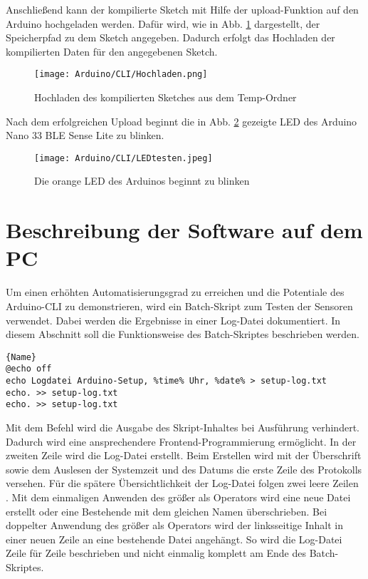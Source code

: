 Anschließend kann der kompilierte Sketch mit Hilfe der \glqq upload\grqq{}-Funktion auf den Arduino hochgeladen werden. Dafür wird, wie in Abb. \ref{Hochladen} dargestellt, der Speicherpfad zu dem Sketch angegeben. Dadurch erfolgt das Hochladen der kompilierten Daten für den angegebenen Sketch.

\begin{figure}[h]
    \begin{center}
        \texttt{[image: Arduino/CLI/Hochladen.png]}
        \caption{Hochladen des kompilierten Sketches aus dem Temp-Ordner}
        \label{Hochladen}
    \end{center}
\end{figure}


Nach dem erfolgreichen Upload beginnt die in Abb. \ref{LEDtest} gezeigte LED des Arduino Nano 33 BLE Sense Lite zu blinken.

\begin{figure}[h]
    \begin{center}
        \texttt{[image: Arduino/CLI/LEDtesten.jpeg]}
        \caption{Die orange LED des Arduinos beginnt zu blinken}
        \label{LEDtest}
    \end{center}
\end{figure}


\section{Beschreibung der Software auf dem PC}

Um einen erhöhten Automatisierungsgrad zu erreichen und die Potentiale des Arduino-CLI zu demonstrieren, wird ein Batch-Skript zum Testen der Sensoren verwendet. Dabei werden die Ergebnisse in einer Log-Datei dokumentiert. In diesem Abschnitt soll die Funktionsweise des Batch-Skriptes beschrieben werden.

{\small 
\begin{lstlisting}{Name}
@echo off
echo Logdatei Arduino-Setup, %time% Uhr, %date% > setup-log.txt
echo. >> setup-log.txt
echo. >> setup-log.txt
\end{lstlisting}
}

Mit dem Befehl  wird die Ausgabe des Skript-Inhaltes bei Ausführung verhindert. Dadurch wird eine ansprechendere Frontend-Programmierung ermöglicht. In der zweiten Zeile wird die Log-Datei erstellt. Beim Erstellen wird mit der Überschrift  sowie dem Auslesen der Systemzeit  und des Datums  die erste Zeile des Protokolls versehen. Für die spätere Übersichtlichkeit der Log-Datei folgen zwei leere Zeilen . Mit dem einmaligen Anwenden des größer als Operators  wird eine neue Datei erstellt oder eine Bestehende mit dem gleichen Namen überschrieben. Bei doppelter Anwendung des größer als Operators  wird der linksseitige Inhalt in einer neuen Zeile an eine bestehende Datei angehängt. So wird die Log-Datei Zeile für Zeile beschrieben und nicht einmalig komplett am Ende des Batch-Skriptes.

